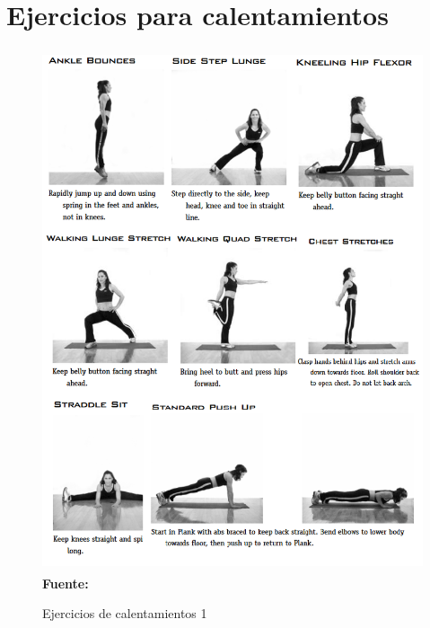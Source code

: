 \section{Ejercicios para calentamientos} \label{anx:warmup}
\begin{figure}[H]
	\caption{Ejercicios de calentamientos 1}
	\label{fig:anxWarmup1}
	\centering
	\includegraphics[width=430px,height=580px]{graphics/warmup1.PNG} \\
	\textbf{Fuente:} \cite{arbour2006strength}
\end{figure}

